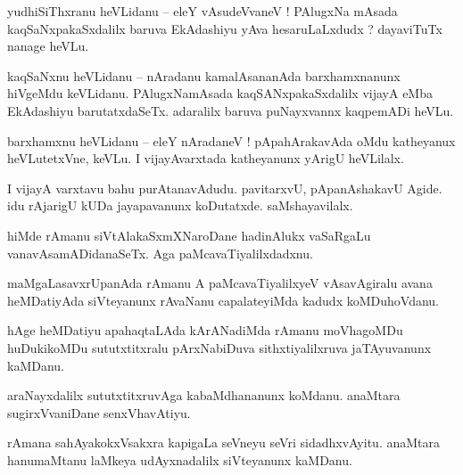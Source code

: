 \documentclass{article}
\begin{document}

\begin{mn}%
yudhiSiThxranu heVLidanu -- eleY vAsudeVvaneV ! PAlugxNa mAsada kaqSaNxpakaSxdalilx baruva 
EkAdashiyu yAva hesaruLaLxdudx ? dayaviTuTx nanage heVLu.
\end{mn}

\begin{mn}%
kaqSaNxnu heVLidanu -- nAradanu kamalAsananAda barxhamxnanunx hiVgeMdu keVLidanu. PAlugxNamAsada 
kaqSANxpakaSxdalilx vijayA eMba EkAdashiyu barutatxdaSeTx. adaralilx baruva puNayxvannx kaqpemADi 
heVLu.
\end{mn}

\begin{mn}%
barxhamxnu heVLidanu -- eleY nAradaneV ! pApahArakavAda oMdu katheyanux heVLutetxVne, keVLu. I 
vijayAvarxtada katheyanunx yArigU heVLilalx.
\end{mn}

\begin{mn}%
I vijayA varxtavu bahu purAtanavAdudu. pavitarxvU, pApanAshakavU Agide. idu rAjarigU kUDa 
jayapavanunx koDutatxde. saMshayavilalx.
\end{mn}

\begin{mn}%
hiMde rAmanu siVtAlakaSxmXNaroDane hadinAlukx vaSaRgaLu vanavAsamADidanaSeTx. Aga 
paMcavaTiyalilxdadxnu.
\end{mn}

\begin{mn}%
maMgaLasavxrUpanAda rAmanu A paMcavaTiyalilxyeV vAsavAgiralu avana heMDatiyAda siVteyanunx rAvaNanu 
capalateyiMda kadudx koMDuhoVdanu.
\end{mn}

\begin{mn}%
hAge heMDatiyu apahaqtaLAda kArANadiMda rAmanu moVhagoMDu huDukikoMDu sututxtitxralu pArxNabiDuva 
sithxtiyalilxruva jaTAyuvanunx kaMDanu.
\end{mn}

\begin{mn}%
araNayxdalilx sututxtitxruvAga kabaMdhananunx koMdanu. anaMtara sugirxVvaniDane senxVhavAtiyu.
\end{mn}

\begin{mn}%
rAmana sahAyakokxVsakxra kapigaLa seVneyu seVri sidadhxvAyitu. anaMtara hanumaMtanu laMkeya 
udAyxnadalilx siVteyanunx kaMDanu.
\end{mn}
\end{document}
